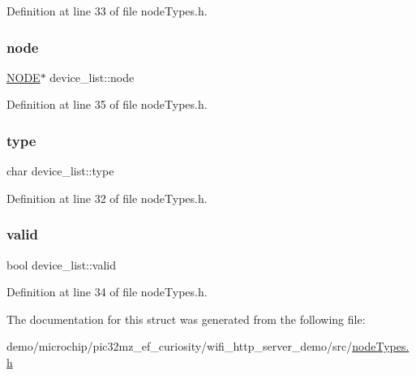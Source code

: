 Definition at line 33 of file node\+Types.\+h.

\mbox{\label{structdevice__list_ad0990a0ea9bbf15244aeff7af1d24de3}} 
\subsubsection{\texorpdfstring{node}{node}}
{\footnotesize\ttfamily \hyperlink{nodeTypes_8h_a1769d7b9a8e16cf2b9da663b2c218e08}{N\+O\+DE}$\ast$ device\+\_\+list\+::node}



Definition at line 35 of file node\+Types.\+h.

\mbox{\label{structdevice__list_aa21a5d471aa33420571814a6ab92cb60}} 
\subsubsection{\texorpdfstring{type}{type}}
{\footnotesize\ttfamily char device\+\_\+list\+::type}



Definition at line 32 of file node\+Types.\+h.

\mbox{\label{structdevice__list_aed5043f9260f4acf1b56ba891e5a585d}} 
\subsubsection{\texorpdfstring{valid}{valid}}
{\footnotesize\ttfamily bool device\+\_\+list\+::valid}



Definition at line 34 of file node\+Types.\+h.



The documentation for this struct was generated from the following file\+:\begin{DoxyCompactItemize}
\item 
demo/microchip/pic32mz\+\_\+ef\+\_\+curiosity/wifi\+\_\+http\+\_\+server\+\_\+demo/src/\hyperlink{nodeTypes_8h}{node\+Types.\+h}\end{DoxyCompactItemize}
